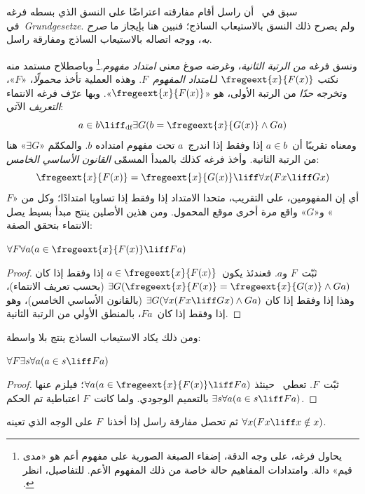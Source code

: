 \documentclass[../../../include/open-logic-section]{subfiles}
\begin{document}


سبق في~ أن راسل أقام مفارقته اعتراضًا على النسق الذي
بسطه فرغه في~\emph{Grundgesetze}. ولم يصرح ذلك النسق بالاستيعاب
الساذج؛ فنبين هنا بإيجاز ما \emph{صرح به}، ووجه اتصاله بالاستيعاب
الساذج ومفارقة راسل.

ونسق فرغه \emph{من الرتبة الثانية}، وغرضه صوغ معنى
\emph{امتداد مفهوم}.\footnote{يحاول فرغه، على وجه الدقة، إضفاء الصبغة
  الصورية على مفهوم أعم هو «مدى قيم» دالة. وامتدادات المفاهيم حالة خاصة
  من ذلك المفهوم الأعم. للتفاصيل، انظر
  \citet[pp.\ 8--9]{Heck2012}.} وباصطلاح مستمد منه نكتب
$\fregeext{x}{F(x)}$ لـ\emph{امتداد المفهوم~$F$}. وهذه العملية تأخذ
\emph{محمولًا}، «$F$»، وتخرجه \emph{حدًا} من الرتبة الأولى، هو
«$\fregeext{x}{F(x)}$». وبها عرّف فرغه الانتماء \emph{التعريف} الآتي:
\[
	a \in b \liff_\text{df} \exists G(b = \fregeext{x}{G(x)} \land Ga)
\]
ومعناه تقريبًا أن~$a \in b$ إذا وفقط إذا اندرج~$a$ تحت مفهوم امتداده
$b$. والمكمّم «$\exists G$» هنا من الرتبة الثانية. وأخذ فرغه كذلك
بالمبدأ المسمّى \emph{القانون الأساسي الخامس}:
$$\fregeext{x}{F(x)} = \fregeext{x}{G(x)} \liff \forall x (Fx \liff Gx)$$
أي إن المفهومين، على التقريب، متحدا الامتداد إذا وفقط إذا تساويا
امتدادًا؛ وكل من «$F$» و«$G$» واقع مرة أخرى موقع المحمول. ومن هذين
الأصلين ينتج مبدأ بسيط يصل الانتماء بتحقق الصفة:

\begin{lem}
$\forall F \forall a(a \in \fregeext{x}{F(x)} \liff Fa)$
\end{lem}

\begin{proof}
ثبّت~$F$ و$a$. فعندئذ يكون~$a \in \fregeext{x}{F(x)}$ إذا وفقط إذا كان
$\exists G(\fregeext{x}{F(x)} = \fregeext{x}{G(x)} \land Ga)$
(بحسب تعريف الانتماء)، وهذا إذا وفقط إذا كان
$\exists G(\forall x(Fx \liff Gx) \land Ga)$
(بالقانون الأساسي الخامس)، وهو إذا وفقط إذا كان~$Fa$، بالمنطق الأولي
من الرتبة الثانية.
\end{proof}

ومن ذلك يكاد الاستيعاب الساذج ينتج بلا واسطة:

\begin{lem}
$\forall F \exists s \forall a (a \in s \liff Fa)$
\end{lem}

\begin{proof}
ثبّت~$F$. تعطي~ حينئذ
$\forall a (a \in \fregeext{x}{F(x)} \liff Fa)$؛ فيلزم عنها
$\exists s\forall a(a \in s \liff Fa)$ بالتعميم الوجودي. ولما كانت~$F$
اعتباطية تم الحكم.
\end{proof}

ثم تحصل مفارقة راسل إذا أخذنا~$F$ على الوجه الذي تعينه
$\forall x(Fx \liff x \notin x)$.
\end{document}
